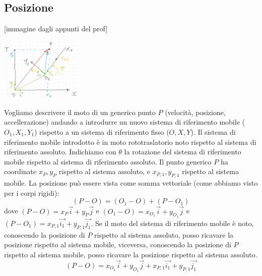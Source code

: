 \subsection{Posizione}
[immagine dagli appunti del prof]
\begin{center}
    \includegraphics[height=3cm]{../lezione3/img3.JPG}
\end{center}
Vogliamo descrivere il moto di un generico punto $P$ (velocità, posizione, accellerazione) andando a introdurre un nuovo sistema di riferimento mobile ($O_1, X_1, Y_1$) rispetto a un sistema di riferimento fisso ($O, X, Y$).\newline
Il sistema di riferimento mobile introdotto è in moto rototraslatorio noto rispetto al sistema di riferimento assoluto.\newline
Indichiamo con $\theta$ la rotazione del sistema di riferimento mobile rispetto al sistema di riferimento assoluto.\newline
\newline
Il punto generico $P$ ha coordinate $x_P, y_P$ rispetto al sistema assoluto, e $x_{P,1}, y_{P,1}$ rispetto al sistema mobile. \newline
\newline
La posizione può essere vista come somma vettoriale (come abbiamo visto per i corpi rigidi): 
\[
    (P-O) = (O_1 - O) + (P-O_1)
\]
dove $(P-O) = x_P \vec{i} + y_P \vec{j}$ e $(O_1 - O) = x_{O_1} \vec{i} + y_{O_1} \vec{j}$ e $(P-O_1) = x_{P,1} \vec{i_1} + y_{P,1} \vec{j_1}$. Se il moto del sistema di riferimento mobile è noto, conoscendo la posizione di $P$ rispetto al sistema assoluto, posso ricavare la posizione rispetto al sistema mobile, viceversa, conoscendo la posizione di $P$ rispetto al sistema mobile, posso ricavare la posizione rispetto al sistema assoluto.
\[
    (P-O) = x_{O_1}\vec{i} + y_{O_1}\vec{j} + x_{P,1} \vec{i_1} + y_{P,1} \vec{j_1}
\]

